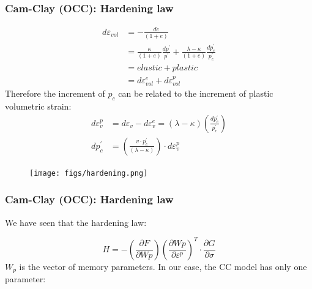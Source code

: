 \documentclass[notes]{beamer}
\begin{document}
\begin{frame}
\frametitle{Cam-Clay (OCC): Hardening law}
\noindent
\fboxsep=0pt
\noindent
\begin{minipage}[t]{0.65\linewidth}
\begin{align*}
d\varepsilon_{vol} & = - \frac{de}{(1 + e)} \\
   & = \frac{\kappa}{(1 + e)}\frac{dp^\prime}{p^\prime} + \frac{\lambda - \kappa}{(1 + e)}\frac{dp_c^\prime}{p_c^\prime} \\
   & = elastic + plastic\\
   & = d\varepsilon_{vol}^e + d\varepsilon_{vol}^p
\end{align*}
Therefore the increment of $p_c$ can be related to the increment of plastic volumetric strain:
\begin{align*}
d\varepsilon_v^p & = 	d\varepsilon_v - 	d\varepsilon_v^e = (\lambda - \kappa)\left(\frac{dp_c^\prime}{p_c^\prime}\right) \\
dp_c^\prime & = \left(\frac{v\cdot p_c^\prime}{(\lambda - \kappa)}\right) \cdot d \varepsilon_v^p
\end{align*}
\end{minipage}%
\hfill
\begin{minipage}[t]{0.35\linewidth}
	\begin{figure}
		\texttt{[image: figs/hardening.png]}
	\end{figure}
\end{minipage}
\end{frame}




\begin{frame}
\frametitle{Cam-Clay (OCC): Hardening law}
We have seen that the hardening law:

\begin{equation*}
H = - \left(\frac{\partial F}{\partial Wp}\right)\left(\frac{\partial Wp}{\partial \varepsilon^p}\right)^T\cdot\frac{\partial G}{\partial \sigma}
\end{equation*}
$W_p$ is the vector of memory parameters. In our case, the CC model has only one parameter:
\end{frame}
\end{document}
